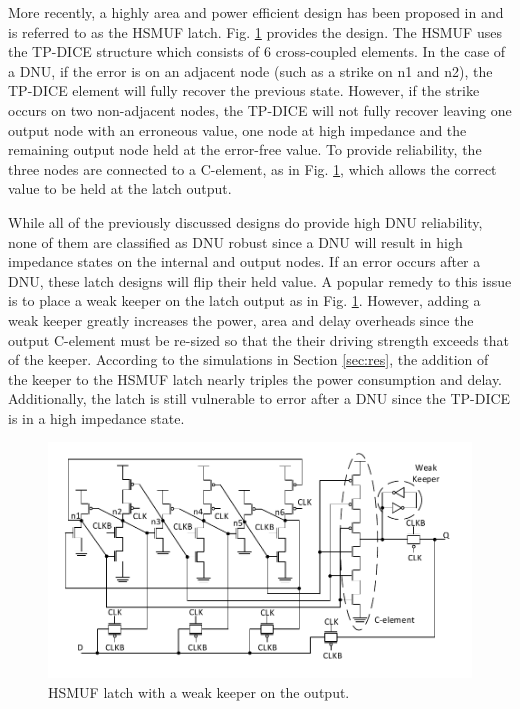 More recently, a highly area and power efficient design has been proposed in \cite{HSMUF} and is referred to as the HSMUF latch. Fig. \ref{HSMUF_fig} provides the design. The HSMUF uses the TP-DICE \cite{TPDICE} structure which consists of 6 cross-coupled elements. In the case of a DNU, if the error is on an adjacent node (such as a strike on n1 and n2), the TP-DICE element will fully recover the previous state. However, if the strike occurs on two non-adjacent nodes, the TP-DICE will not fully recover leaving one output node with an erroneous value, one node at high impedance and the remaining output node held at the error-free value. To provide reliability, the three nodes are connected to a C-element, as in Fig. \ref{HSMUF_fig}, which allows the correct value to be held at the latch output. 

While all of the previously discussed designs do provide high DNU reliability, none of them are classified as DNU robust since a DNU will result in high impedance states on the internal and output nodes. If an error occurs after a DNU, these latch designs will flip their held value. A popular remedy to this issue is to place a weak keeper on the latch output as in Fig. \ref{HSMUF_fig}. However, adding a weak keeper greatly increases the power, area and delay overheads since the output C-element must be re-sized so that the their driving strength exceeds that of the keeper. According to the simulations in Section \ref{sec:res}, the addition of the keeper to the HSMUF latch nearly triples the power consumption and delay. Additionally, the latch is still vulnerable to error after a DNU since the TP-DICE is in a high impedance state.

\begin{figure}[!htbp]
	\centering
	\includegraphics[width=\linewidth]{Figures/HSMUF}
	\caption{HSMUF latch \cite{HSMUF} with a weak keeper on the output.}
	\label{HSMUF_fig}
\end{figure}

